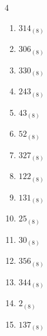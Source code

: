 \begin{multicols}{4}
\begin{enumerate}
        \phantom{$=185$}

  \item $314_{(8)}$

        \phantom{$=204$}

  \item $306_{(8)}$

        \phantom{$=198$}

  \item $330_{(8)}$

        \phantom{$=216$}

  \item $243_{(8)}$

        \phantom{$=163$}

  \item $43_{(8)}$

        \phantom{$=35$}

  \item $52_{(8)}$

        \phantom{$=42$}

  \item $327_{(8)}$

        \phantom{$=215$}

  \item $122_{(8)}$

        \phantom{$=82$}

\columnbreak %

  \item $131_{(8)}$

        \phantom{$=89$}

  \item $25_{(8)}$

        \phantom{$=21$}

  \item $30_{(8)}$

        \phantom{$=24$}

  \item $356_{(8)}$

        \phantom{$=238$}

  \item $344_{(8)}$

        \phantom{$=228$}

  \item $2_{(8)}$

        \phantom{$=2$}

  \item $137_{(8)}$

        \phantom{$=95$}


\end{enumerate}
\end{multicols}

